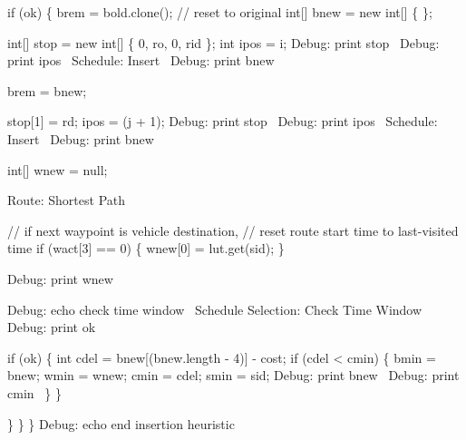           if (ok) \{
            brem = bold.clone();  // reset to original
            int[] bnew = new int[] \{ \};

            int[] stop = new int[] \{ 0, ro, 0, rid \};
            int ipos = i;
            \LA{}Debug: print stop~{\nwtagstyle{}}\RA{}
            \LA{}Debug: print ipos~{\nwtagstyle{}}\RA{}
            \LA{}Schedule: Insert~{\nwtagstyle{}}\RA{}
            \LA{}Debug: print bnew~{\nwtagstyle{}}\RA{}

            brem = bnew;

            stop[1] = rd;
            ipos = (j + 1);
            \LA{}Debug: print stop~{\nwtagstyle{}}\RA{}
            \LA{}Debug: print ipos~{\nwtagstyle{}}\RA{}
            \LA{}Schedule: Insert~{\nwtagstyle{}}\RA{}
            \LA{}Debug: print bnew~{\nwtagstyle{}}\RA{}

            int[] wnew = null;

            \LA{}Route: Shortest Path~{\nwtagstyle{}}\RA{}

            // if next waypoint is vehicle destination,
            // reset route start time to last-visited time
            if (wact[3] == 0) \{
              wnew[0] = lut.get(sid);
            \}

            \LA{}Debug: print wnew~{\nwtagstyle{}}\RA{}

            \LA{}Debug: echo check time window~{\nwtagstyle{}}\RA{}
            \LA{}Schedule Selection: Check Time Window~{\nwtagstyle{}}\RA{}
            \LA{}Debug: print ok~{\nwtagstyle{}}\RA{}

            if (ok) \{
              int cdel = bnew[(bnew.length - 4)] - cost;
              if (cdel < cmin) \{
                bmin = bnew;
                wmin = wnew;
                cmin = cdel;
                smin = sid;
                \LA{}Debug: print bnew~{\nwtagstyle{}}\RA{}
                \LA{}Debug: print cmin~{\nwtagstyle{}}\RA{}
              \}
            \}

          \}
        \}
      \}
      \LA{}Debug: echo end insertion heuristic~{\nwtagstyle{}}\RA{}

